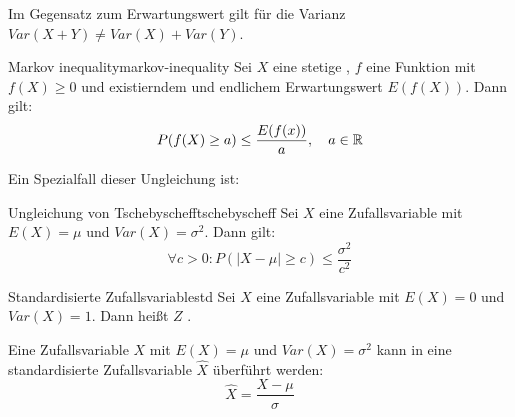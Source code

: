 Im Gegensatz zum Erwartungswert gilt für die Varianz $Var(X+Y) \ne Var(X) +
Var(Y)$.

\begin{theorem}{Markov inequality}{markov-inequality}
Sei $X$ eine stetige , $f$ eine Funktion mit
$f(X)\ge 0$ und existierndem und endlichem Erwartungswert $E(f(X))$. Dann gilt:
\[P(f(X)\ge a)\le \frac{E(f(x))}{a},\quad a\in\mathbb{R}\]
\end{theorem}
Ein Spezialfall dieser Ungleichung ist:
\begin{theorem}{Ungleichung von Tschebyscheff}{tschebyscheff}
Sei $X$ eine Zufallsvariable mit $E(X) = \mu$ und $Var(X) = \sigma^2$. Dann
gilt:
\[\forall c>0: P(|X-\mu|\ge c) \le\frac{\sigma^2}{c^2}\]
\end{theorem}

\begin{definition}{Standardisierte Zufallsvariable}{std}
Sei $X$ eine Zufallsvariable mit $E(X) = 0$ und $Var(X) = 1$. Dann heißt $Z$
.
\end{definition}

Eine Zufallsvariable $X$ mit $E(X) = \mu$ und $Var(X)=\sigma^2$ kann in eine
standardisierte Zufallsvariable $\hat{X}$ überführt werden:
\[\hat{X} = \frac{X-\mu}{\sigma}\]
